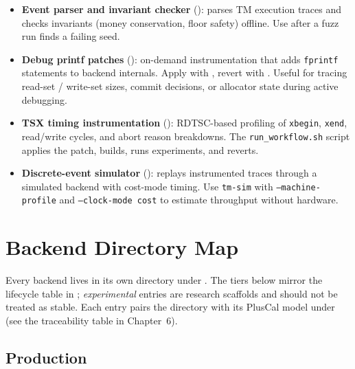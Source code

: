 \begin{itemize}
    \item \textbf{Event parser and invariant checker}
          (): parses TM execution traces and
          checks invariants (money conservation, floor safety) offline.
          Use after a fuzz run finds a failing seed.
    \item \textbf{Debug printf patches}
          (): on-demand instrumentation that adds
          \texttt{fprintf} statements to backend internals.  Apply with
          , revert with
          .  Useful for tracing read-set
          / write-set sizes, commit decisions, or allocator state during
          active debugging.
    \item \textbf{TSX timing instrumentation}
          (): RDTSC-based profiling of
          \texttt{xbegin}, \texttt{xend}, read/write cycles, and abort
          reason breakdowns.  The \texttt{run\_workflow.sh} script applies
          the patch, builds, runs experiments, and reverts.
    \item \textbf{Discrete-event simulator}
          (): replays instrumented traces through a
          simulated backend with cost-mode timing.  Use \texttt{tm-sim}
          with \texttt{--machine-profile} and \texttt{--clock-mode cost}
          to estimate throughput without hardware.
\end{itemize}

\section{Backend Directory Map}
\label{sec:repo-backend-map}

Every backend lives in its own directory under
.  The tiers below mirror the lifecycle table in
; \emph{experimental} entries are research
scaffolds and should not be treated as stable.  Each entry pairs the
directory with its PlusCal model under  (see the
traceability table in Chapter~6).

\subsection{Production}

